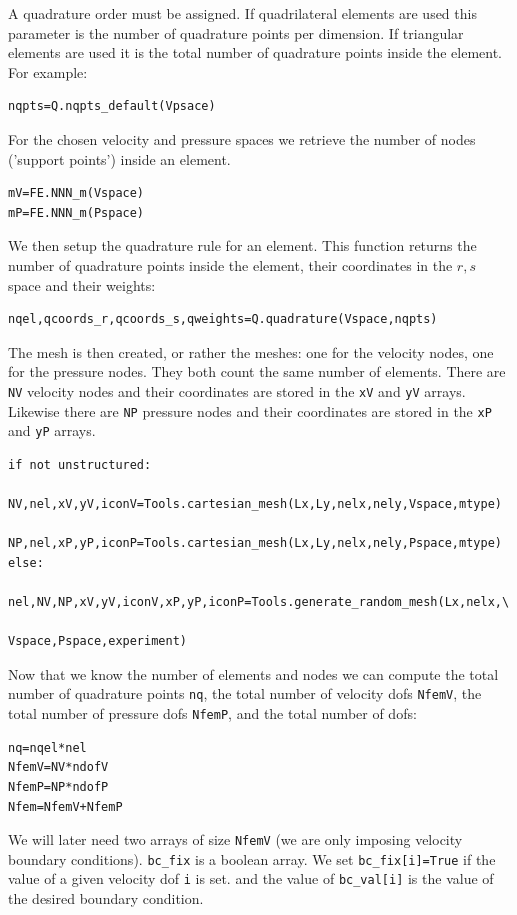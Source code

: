 A quadrature order must be assigned. If quadrilateral elements are used
this parameter is the number of quadrature points per dimension. 
If triangular elements are used it is the total number of quadrature points 
inside the element. For example: 
\begin{lstlisting}
nqpts=Q.nqpts_default(Vpsace)
\end{lstlisting}

For the chosen velocity and pressure spaces we retrieve the number of nodes 
('support points') inside an element.
\begin{lstlisting}
mV=FE.NNN_m(Vspace)
mP=FE.NNN_m(Pspace)
\end{lstlisting}

We then setup the quadrature rule for an element. This function 
returns the number of quadrature points inside the element, 
their coordinates in the $r,s$ space and their weights: 
\begin{lstlisting}
nqel,qcoords_r,qcoords_s,qweights=Q.quadrature(Vspace,nqpts)
\end{lstlisting}

The mesh is then created, or rather the meshes: one for the 
velocity nodes, one for the pressure nodes. They both count the 
same number of elements. There are \lstinline{NV} velocity nodes and their
coordinates are stored in the \lstinline{xV} and \lstinline{yV} arrays.
Likewise there are \lstinline{NP} pressure nodes and their
coordinates are stored in the \lstinline{xP} and \lstinline{yP} arrays. 

\begin{lstlisting}
if not unstructured:
   NV,nel,xV,yV,iconV=Tools.cartesian_mesh(Lx,Ly,nelx,nely,Vspace,mtype)
   NP,nel,xP,yP,iconP=Tools.cartesian_mesh(Lx,Ly,nelx,nely,Pspace,mtype)
else:
   nel,NV,NP,xV,yV,iconV,xP,yP,iconP=Tools.generate_random_mesh(Lx,nelx,\
                                                 Vspace,Pspace,experiment)  
\end{lstlisting}

Now that we know the number of elements and nodes we can compute the 
total number of quadrature points \lstinline{nq}, 
the total number of velocity dofs \lstinline{NfemV}, 
the total number of pressure dofs \lstinline{NfemP}, 
and the total number of dofs:

\begin{lstlisting}
nq=nqel*nel
NfemV=NV*ndofV
NfemP=NP*ndofP
Nfem=NfemV+NfemP
\end{lstlisting}

We will later need two arrays of size \lstinline{NfemV} (we are only imposing
velocity boundary conditions). \lstinline{bc_fix} is a boolean array.
We set \lstinline{bc_fix[i]=True} if the value of a given velocity dof \lstinline{i} is set. 
and the value of \lstinline{bc_val[i]} is the value of the desired boundary condition.

